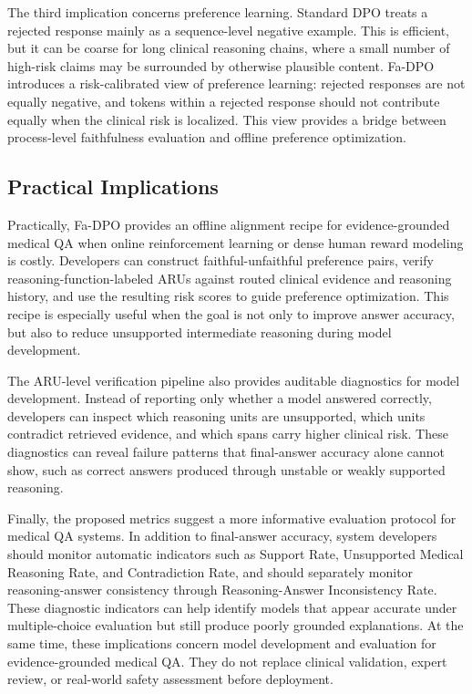 \documentclass[a4paper,fleqn,doubleblind]{cas-sc}
\begin{document}
The third implication concerns preference learning. Standard DPO treats a rejected response mainly as a sequence-level negative example. This is efficient, but it can be coarse for long clinical reasoning chains, where a small number of high-risk claims may be surrounded by otherwise plausible content. Fa-DPO introduces a risk-calibrated view of preference learning: rejected responses are not equally negative, and tokens within a rejected response should not contribute equally when the clinical risk is localized. This view provides a bridge between process-level faithfulness evaluation and offline preference optimization.

\subsection{Practical Implications}
Practically, Fa-DPO provides an offline alignment recipe for evidence-grounded medical QA when online reinforcement learning or dense human reward modeling is costly. Developers can construct faithful-unfaithful preference pairs, verify reasoning-function-labeled ARUs against routed clinical evidence and reasoning history, and use the resulting risk scores to guide preference optimization. This recipe is especially useful when the goal is not only to improve answer accuracy, but also to reduce unsupported intermediate reasoning during model development.

The ARU-level verification pipeline also provides auditable diagnostics for model development. Instead of reporting only whether a model answered correctly, developers can inspect which reasoning units are unsupported, which units contradict retrieved evidence, and which spans carry higher clinical risk. These diagnostics can reveal failure patterns that final-answer accuracy alone cannot show, such as correct answers produced through unstable or weakly supported reasoning.

Finally, the proposed metrics suggest a more informative evaluation protocol for medical QA systems. In addition to final-answer accuracy, system developers should monitor automatic indicators such as Support Rate, Unsupported Medical Reasoning Rate, and Contradiction Rate, and should separately monitor reasoning-answer consistency through Reasoning-Answer Inconsistency Rate. These diagnostic indicators can help identify models that appear accurate under multiple-choice evaluation but still produce poorly grounded explanations. At the same time, these implications concern model development and evaluation for evidence-grounded medical QA. They do not replace clinical validation, expert review, or real-world safety assessment before deployment.
\end{document}
